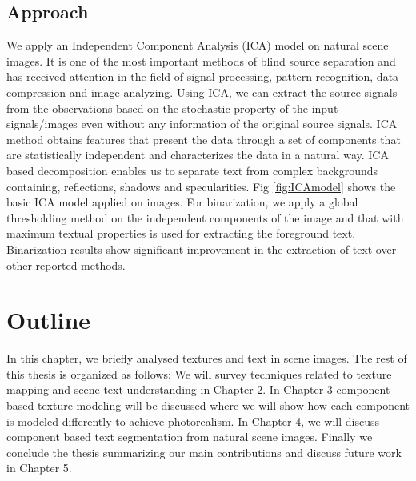\subsection{Approach}
We apply an Independent Component Analysis (ICA) model on natural scene images.
It is one of the most important methods of blind source separation and has received  
attention in the field of signal processing, pattern recognition, data compression and image analyzing.
Using ICA,  we can extract the source signals from the 
observations based on the stochastic property of the input signals/images
even without any information of the original source signals.  
ICA method obtains features that present the data through a set of 
components that are statistically independent and characterizes the data 
in a natural way. 
ICA based decomposition enables us to separate text from complex backgrounds containing, reflections,
shadows and specularities. Fig \ref{fig:ICAmodel} shows the basic ICA model applied on images.
For binarization, we apply a global thresholding method on the independent components of the image
and that with maximum textual properties is used for extracting the foreground text. Binarization results show 
significant improvement in the extraction of text over other reported methods. 




\section{Outline}


In this chapter, we briefly analysed textures and text in scene images. 
The rest of this thesis is organized as follows: 
We will survey techniques related to texture mapping and scene text understanding in Chapter 2. In Chapter 3
component based texture modeling will be discussed where we will show how each component is
modeled differently to achieve photorealism.
In Chapter 4, we will discuss component based text segmentation from natural scene images. Finally we 
conclude the thesis summarizing our main contributions and discuss future work in Chapter 5.


